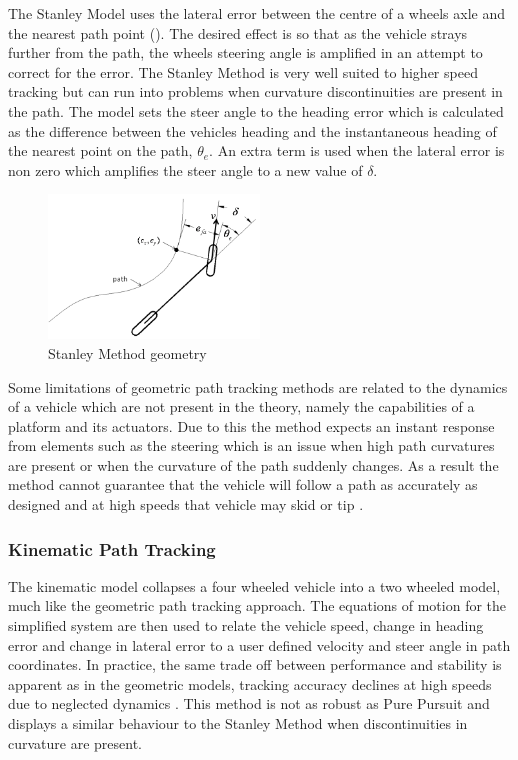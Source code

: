 \documentclass[main.tex]{subfiles}
\begin{document}
The Stanley Model uses the lateral error between the centre of a wheels axle and the nearest path point (). The desired effect is so that as the vehicle strays further from the path, the wheels steering angle is amplified in an attempt to correct for the error. The Stanley Method is very well suited to higher speed tracking but can run into problems when curvature discontinuities are present in the path. The model sets the steer angle to the heading error which is calculated as the difference between the vehicles heading and the instantaneous heading of the nearest point on the path, $\theta_e$. An extra term is used when the lateral error is non zero which amplifies the steer angle to a new value of $\delta$.
\begin{figure}[ht]
\includegraphics[width=0.5\textwidth]{3-LiteratureReview/stanleyMethod.png}
\centering
\caption[Stanley Method geometry]{Stanley Method geometry \parencite{snider2009}} 
\end{figure}

Some limitations of geometric path tracking methods are related to the dynamics of a vehicle which are not present in the theory, namely the capabilities of a platform and its actuators. Due to this the method expects an instant response from elements such as the steering which is an issue when high path curvatures are present or when the curvature of the path suddenly changes. As a result the method cannot guarantee that the vehicle will follow a path as accurately as designed and at high speeds that vehicle may skid or tip \parencite{coulter1992}.

\subsubsection{Kinematic Path Tracking}
The kinematic model collapses a four wheeled vehicle into a two wheeled model, much like the geometric path tracking approach. The equations of motion for the simplified system are then used to relate the vehicle speed, change in heading error and change in lateral error to a user defined velocity and steer angle in path coordinates. In practice, the same trade off between performance and stability is apparent as in the geometric models, tracking accuracy declines at high speeds due to neglected dynamics \parencite{snider2009}. This method is not as robust as Pure Pursuit and displays a similar behaviour to the Stanley Method when discontinuities in curvature are present.
\end{document}
